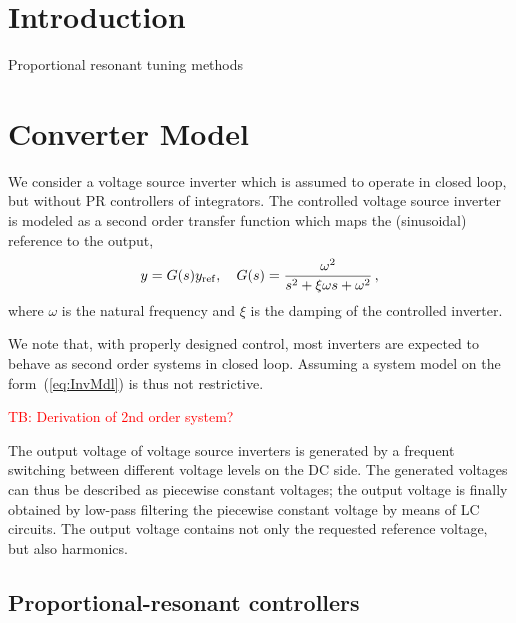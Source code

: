 \documentclass[conference,10pt]{IEEEtran}
\newcommand{\tb}[1]{\textcolor{red}{TB: #1}}
\begin{document}
\IEEEpeerreviewmaketitle


\section{Introduction}

 Proportional resonant tuning methods \cite{568021,6184594,6153368,5338054,6870109,993175,5398914 }




\section{Converter Model}




We consider a voltage source inverter which is assumed to operate in closed loop, but without PR controllers of integrators.  The controlled voltage source inverter is modeled as a second order transfer function which maps the (sinusoidal) reference to the output,
\begin{align}
\label{eq:InvMdl}
y = G(s)y_{\rm ref},\quad G(s) = \frac{\omega^2}{s^2+\xi\omega s + \omega^2}\,,
\end{align}
where $\omega$ is the natural frequency and $\xi$ is the damping of the controlled inverter.

We note that, with properly designed control, most inverters are expected to behave as second order systems in closed loop. Assuming a system model on the form~(\ref{eq:InvMdl}) is thus not restrictive.

\tb{Derivation of 2nd order system?}

The output voltage of voltage source inverters is generated by a frequent switching between different voltage levels on the DC side. The generated voltages can thus be described as piecewise constant voltages; the output voltage is finally obtained by low-pass filtering the piecewise constant voltage by means of LC circuits. The output voltage contains not only the requested reference voltage, but also harmonics.

\subsection{Proportional-resonant controllers}
\end{document}
